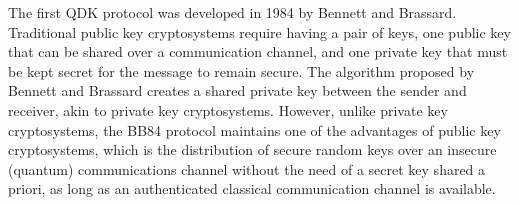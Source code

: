 The first QDK protocol was developed in 1984 by Bennett and Brassard. Traditional public key cryptosystems require having a pair of keys, one public key that can be shared over a communication channel, and one private key that must be kept secret for the message to remain secure. The algorithm proposed by Bennett and Brassard creates a shared private key between the sender and receiver, akin to private key cryptosystems. However, unlike private key cryptosystems, the BB84 protocol maintains one of the advantages of public key cryptosystems, which is the distribution of secure random keys over an insecure (quantum) communications channel without the need of a secret key shared a priori, as long as an authenticated classical communication channel is available. \cite{bennett2014quantum}



